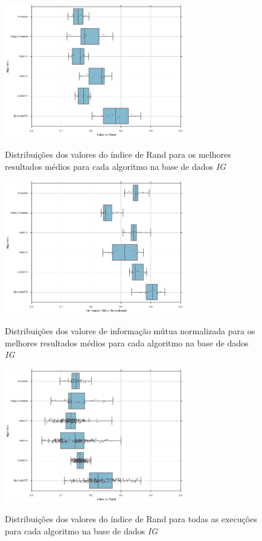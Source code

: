\documentclass[
    12pt,                %
    oneside,            %
    a4paper,            %
    english,            %
    brazil                %
    ]{abntex2ppgsi}
\begin{document}
\begin{figure}[H]
    \centering
    \caption{Distribuições dos valores do índice de Rand para os melhores resultados médios para cada algoritmo na base de dados \textit{IG}}
    \includegraphics[width=0.7\textwidth]{img/boxplot-rand-nips.png}
    \label{fig:boxplot-rand:nips}
\end{figure}

\begin{figure}[H]
    \centering
    \caption{Distribuições dos valores de informação mútua normalizada para os melhores resultados médios para cada algoritmo na base de dados \textit{IG}}
    \includegraphics[width=0.7\textwidth]{img/boxplot-nmi-nips.png}
    \label{fig:boxplot-nmi:nips}
\end{figure}

\begin{figure}[H]
    \centering
    \caption{Distribuições dos valores do índice de Rand para todas as execuções para cada algoritmo na base de dados \textit{IG}}
    \includegraphics[width=0.7\textwidth]{img/boxplot-all-rand-nips.png}
    \label{fig:boxplot-all-rand:nips}
\end{figure}
\end{document}
